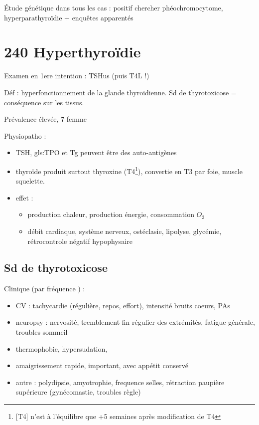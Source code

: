 \documentclass{book}
\begin{document}
Étude génétique dans tous les cas : positif \thus chercher phéochromocytome,
hyperparathyroïdie + enquêtes apparentés
\section{240 \textdagger{} Hyperthyroïdie}
\label{sec:org5f2fcfa}
\begin{tcolorbox}
Examen en 1ere intention : TSHus (puis T4L !)
\end{tcolorbox}

Déf : hyperfonctionnement de la glande thyroïdienne. Sd de thyrotoxicose =
conséquence sur les tissus.

Prévalence élevée, 7\texttimes{} femme

Physiopatho :
\begin{itemize}
\item TSH, gls:TPO et Tg peuvent être des auto-antigènes
\item thyroïde produit surtout thyroxine (T4\footnote{[T4] n'est à l'équilibre que +5 semaines après modification de T4}), convertie en T3 par foie, muscle
squelette.
\item effet : 
\begin{itemize}
\item \inc production chaleur, \inc production énergie, \inc consommation \(O_2\)
\item \inc débit cardiaque, système nerveux, \inc ostéclasie, \inc lipolyse, \inc
glycémie, rétrocontrole négatif hypophysaire
\end{itemize}
\end{itemize}

\subsection{Sd de thyrotoxicose}
\label{sec:org46278a0}
Clinique (par fréquence \dec) :
\begin{itemize}
\item CV : tachycardie (régulière, repos, \inc effort), \inc intensité bruits
coeurs, \inc PAs
\item neuropsy : nervosité, tremblement fin régulier des extrémités, fatigue
générale, troubles sommeil
\item thermophobie, hypersudation,
\item amaigrissement rapide, important, avec appétit conservé
\item autre : polydipsie, amyotrophie, \inc frequence selles, rétraction paupière
supérieure (gynécomastie, troubles règle)
\end{itemize}
\end{document}
